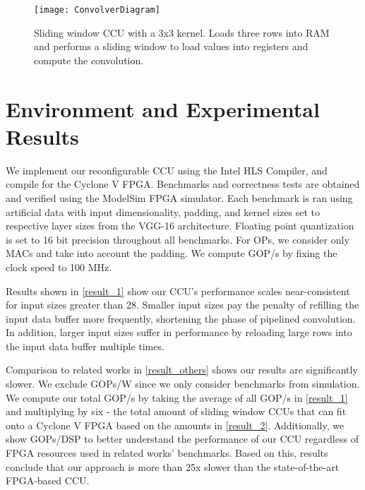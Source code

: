 \begin{figure}
	\centering
	\texttt{[image: ConvolverDiagram]}
	\caption[Convolver Diagram]%
	{\narrower Sliding window CCU with a 3x3 kernel. Loads three rows into RAM and performs a sliding window to load values into registers and compute the convolution.}
	\label{convolver}
\end{figure}


\section{Environment and Experimental Results}
We implement our reconfigurable CCU using the Intel HLS Compiler, and compile for the Cyclone V FPGA. Benchmarks and correctness tests are obtained and verified using the ModelSim FPGA simulator. Each benchmark is ran using artificial data with input dimensionality, padding, and kernel sizes set to respective layer sizes from the VGG-16 architecture. Floating point quantization is set to 16 bit precision throughout all benchmarks. For OPs, we consider only MACs and take into account the padding. We compute GOP/s by fixing the clock speed to 100 MHz.

Results shown in \ref{result_1} show our CCU's performance scales near-consistent for input sizes greater than 28. Smaller input sizes pay the penalty of refilling the input data buffer more frequently, shortening the phase of pipelined convolution. In addition, larger input sizes suffer in performance by reloading large rows into the input data buffer multiple times.

Comparison to related works in \ref{result_others} shows our results are significantly slower. We exclude GOPs/W since we only consider benchmarks from simulation. We compute our total GOP/s by taking the average of all GOP/s in \ref{result_1} and multiplying by six - the total amount of sliding window CCUs that can fit onto a Cyclone V FPGA based on the amounts in \ref{result_2}. Additionally, we show GOPs/DSP to better understand the performance of our CCU regardless of FPGA resources used in related works' benchmarks. Based on this, results conclude that our approach is more than 25x slower than the state-of-the-art FPGA-based CCU.


